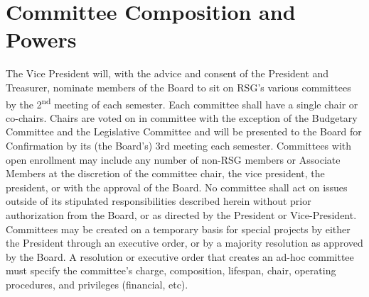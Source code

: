 \section{Committee Composition and Powers}
\begin{enumsubsection}
\itemnotoc The Vice President will, with the advice and consent of the President and 
Treasurer, nominate members of the Board to sit on RSG's various 
committees by the 2\textsuperscript{nd} meeting of each semester. 
\itemnotoc Each committee shall have a single chair or co-chairs. 
\itemnotoc Chairs are voted on in committee with the exception of the Budgetary 
Committee and the Legislative Committee and will be presented to the 
Board for Confirmation by its (the Board's) 3rd meeting each semester. 
\itemnotoc Committees with open enrollment may include any number of non-RSG 
members or Associate Members at the discretion of the committee chair, 
the vice president, the president, or with the approval of the Board. 
\itemnotoc No committee shall act on issues outside of its stipulated responsibilities 
described herein without prior authorization from the Board, or as directed 
by the President or Vice-President. 
\itemnotoc Committees may be created on a temporary basis for special projects by 
either the President through an executive order, or by a majority resolution 
as approved by the Board. A resolution or executive order that creates an 
ad-hoc committee must specify the committee's charge, composition, 
lifespan, chair, operating procedures, and privileges (financial, etc). 
\end{enumsubsection}
